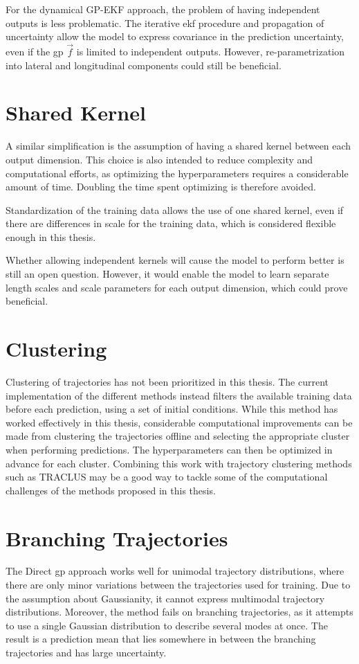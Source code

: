 For the dynamical GP-EKF approach, the problem of having independent outputs is less problematic. The iterative \acrshort{ekf} procedure and propagation of uncertainty allow the model to express covariance in the prediction uncertainty, even if the \acrshort{gp} $\vec{f}$ is limited to independent outputs. However, re-parametrization into lateral and longitudinal components could still be beneficial.

\section{Shared Kernel}
A similar simplification is the assumption of having a shared kernel between each output dimension. This choice is also intended to reduce complexity and computational efforts, as optimizing the hyperparameters requires a considerable amount of time. Doubling the time spent optimizing is therefore avoided. 

Standardization of the training data allows the use of one shared kernel, even if there are differences in scale for the training data, which is considered flexible enough in this thesis.

Whether allowing independent kernels will cause the model to perform better is still an open question. However, it would enable the model to learn separate length scales and scale parameters for each output dimension, which could prove beneficial. 



\section{Clustering}
Clustering of trajectories has not been prioritized in this thesis. The current implementation of the different methods instead filters the available training data before each prediction, using a set of initial conditions. While this method has worked effectively in this thesis, considerable computational improvements can be made from clustering the trajectories offline and selecting the appropriate cluster when performing predictions. The hyperparameters can then be optimized in advance for each cluster. Combining this work with trajectory clustering methods such as TRACLUS \cite{traclus} may be a good way to tackle some of the computational challenges of the methods proposed in this thesis.



\section{Branching Trajectories}
The Direct \acrshort{gp} approach works well for unimodal trajectory distributions, where there are only minor variations between the trajectories used for training. Due to the assumption about Gaussianity, it cannot express multimodal trajectory distributions. Moreover, the method fails on branching trajectories, as it attempts to use a single Gaussian distribution to describe several modes at once. The result is a prediction mean that lies somewhere in between the branching trajectories and has large uncertainty. 

